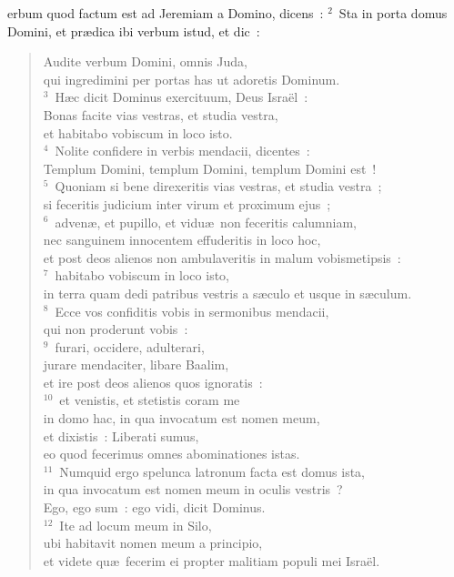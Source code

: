 \bchapter
{}erbum quod factum est ad Jeremiam a Domino, dicens~:
${}^{2}$~Sta in porta domus Domini, et pr\ae dica ibi verbum istud, et dic~: \begin{verse}Audite verbum Domini, omnis Juda,\\ qui ingredimini per portas has ut adoretis Dominum.\\
${}^{3}$~H\ae c dicit Dominus exercituum, Deus Isra\"el~:\\ Bonas facite vias vestras, et studia vestra,\\ et habitabo vobiscum in loco isto.\\
${}^{4}$~Nolite confidere in verbis mendacii, dicentes~:\\ Templum Domini, templum Domini, templum Domini est~!\\
${}^{5}$~Quoniam si bene direxeritis vias vestras, et studia vestra~;\\ si feceritis judicium inter virum et proximum ejus~;\\
${}^{6}$~adven\ae , et pupillo, et vidu\ae\ non feceritis calumniam,\\ nec sanguinem innocentem effuderitis in loco hoc,\\ et post deos alienos non ambulaveritis in malum vobismetipsis~:\\
${}^{7}$~habitabo vobiscum in loco isto,\\ in terra quam dedi patribus vestris a s\ae culo et usque in s\ae culum.\\
${}^{8}$~Ecce vos confiditis vobis in sermonibus mendacii,\\ qui non proderunt vobis~:\\
${}^{9}$~furari, occidere, adulterari,\\ jurare mendaciter, libare Baalim,\\ et ire post deos alienos quos ignoratis~:\\
${}^{10}$~et venistis, et stetistis coram me\\ in domo hac, in qua invocatum est nomen meum,\\ et dixistis~: Liberati sumus,\\ eo quod fecerimus omnes abominationes istas.\\
${}^{11}$~Numquid ergo spelunca latronum facta est domus ista,\\ in qua invocatum est nomen meum in oculis vestris~?\\ Ego, ego sum~: ego vidi, dicit Dominus.\\
${}^{12}$~Ite ad locum meum in Silo,\\ ubi habitavit nomen meum a principio,\\ et videte qu\ae\ fecerim ei propter malitiam populi mei Isra\"el.\\

\end{verse}
